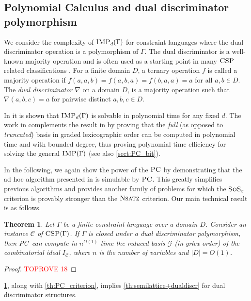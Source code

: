 \documentclass[11pt]{article}
\newcommand{\sos}{\text{\sc{SoS}}}
\newcommand{\Cc}{\mathcal{C}}
\newcommand{\CSP}{\textsc{CSP}}
\newcommand{\IMP}{\textsc{IMP}}
\newcommand{\PC}{\textsc{PC}}
\newcommand{\Nsatz}{\textsc{Nsatz}}
\newcommand{\grlex}{\textsf{grlex }}
\newcommand{\1}{\textbf{1}}
\newcommand{\GB}{\text{Gr\"{o}bner} }
\newtheorem{theorem}{Theorem}[section]
\begin{document}
\subsection{Polynomial Calculus and dual discriminator polymorphism}\label{sect:PCdual}
We consider the complexity of $\IMP_d(\Gamma)$ for constraint languages where the dual discriminator operation is a polymorphism of $\Gamma$. 
The dual discriminator is a well-known majority operation \cite{Jeavons:1997:CPC,barto_et_al:DFU:2017:6959} and is often used as a starting point in many $\CSP$ related classifications \cite{barto_et_al:DFU:2017:6959}. For a finite domain $D$, a ternary operation $f$ is called a majority operation if  $f(a,a,b)=f(a,b,a)=f(b,a,a)=a$ for all $a,b\in D$. The \emph{dual discriminator} $\nabla$ on a domain $D$, is a majority operation such that $\nabla(a,b,c)=a$ for pairwise distinct $a,b,c\in D$.

In \cite{BulatovRSTOC22} it is shown that $\IMP_d(\Gamma)$ is solvable in polynomial time for any fixed $d$. The work in \cite{BharathiM21} complements the result in \cite{BulatovRSTOC22} by proving that the \textit{full} (as opposed to \textit{truncated}) \GB basis in graded lexicographic order can be computed in polynomial time and with bounded degree, thus proving polynomial time efficiency for solving the general $\IMP(\Gamma)$ (see also \cref{sect:PC_bit}).

In the following, we again show the power of the $\PC$ by demonstrating that the ad hoc algorithm presented in \cite{BharathiM21} is simulable by $\PC$. 
This greatly simplifies previous algorithms \cite{BulatovRSTOC22, BharathiM21, BharathiM22} and provides another family of problems for which the $\sos_{\varepsilon}$ criterion is provably stronger than the $\Nsatz$ criterion.
Our main technical result is as follows.
\begin{theorem}\label{th:dual_discriminator}
    Let $\Gamma$ be a finite constraint language over a domain $D$. Consider an instance $\Cc$ of $\CSP(\Gamma)$. If $\Gamma$ is closed under a dual discriminator polymorphism, then \PC\ can compute in $n^{O(1)}$ time the reduced \GB basis $\mathcal{G}$ (in \grlex order) of the combinatorial ideal $I_\Cc$, where $n$ is the number of variables and $|D|=O(1)$.
\end{theorem}
\begin{proof}\textcolor{red}{TOPROVE 18}\end{proof}
\cref{th:dual_discriminator}, along with \cref{th:PC_criterion}, implies \cref{th:semilattice+dualdiscr} for dual discriminator structures. 
\end{document}
